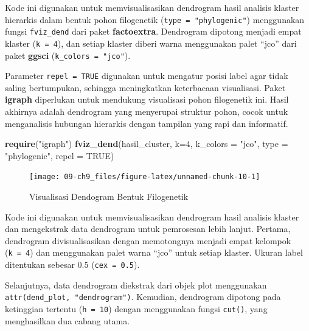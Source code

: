 \documentclass[
  oneside]{book}
\newenvironment{Shaded}{\begin{snugshade}}{\end{snugshade}}
\newcommand{\AttributeTok}[1]{\textcolor[rgb]{0.13,0.29,0.53}{#1}}
\newcommand{\ConstantTok}[1]{\textcolor[rgb]{0.56,0.35,0.01}{#1}}
\newcommand{\DecValTok}[1]{\textcolor[rgb]{0.00,0.00,0.81}{#1}}
\newcommand{\FunctionTok}[1]{\textcolor[rgb]{0.13,0.29,0.53}{\textbf{#1}}}
\newcommand{\NormalTok}[1]{#1}
\newcommand{\StringTok}[1]{\textcolor[rgb]{0.31,0.60,0.02}{#1}}
\begin{document}
Kode ini digunakan untuk memvisualisasikan dendrogram hasil analisis klaster hierarkis dalam bentuk pohon filogenetik (\texttt{type\ =\ "phylogenic"}) menggunakan fungsi \texttt{fviz\_dend} dari paket \textbf{factoextra}. Dendrogram dipotong menjadi empat klaster (\texttt{k\ =\ 4}), dan setiap klaster diberi warna menggunakan palet ``jco'' dari paket \textbf{ggsci} (\texttt{k\_colors\ =\ "jco"}).

Parameter \texttt{repel\ =\ TRUE} digunakan untuk mengatur posisi label agar tidak saling bertumpukan, sehingga meningkatkan keterbacaan visualisasi. Paket \textbf{igraph} diperlukan untuk mendukung visualisasi pohon filogenetik ini. Hasil akhirnya adalah dendrogram yang menyerupai struktur pohon, cocok untuk menganalisis hubungan hierarkis dengan tampilan yang rapi dan informatif.

\begin{Shaded}
\begin{Highlighting}[]
\FunctionTok{require}\NormalTok{(}\StringTok{"igraph"}\NormalTok{)}
\FunctionTok{fviz\_dend}\NormalTok{(hasil\_cluster, }\AttributeTok{k=}\DecValTok{4}\NormalTok{, }\AttributeTok{k\_colors =} \StringTok{"jco"}\NormalTok{,}
\AttributeTok{type =} \StringTok{"phylogenic"}\NormalTok{, }\AttributeTok{repel =} \ConstantTok{TRUE}\NormalTok{)}
\end{Highlighting}
\end{Shaded}

\begin{figure}[h]

{\centering \texttt{[image: 09-ch9\_files/figure-latex/unnamed-chunk-10-1]} 

}

\caption{Visualisasi Dendogram Bentuk Filogenetik}\label{fig:unnamed-chunk-10}
\end{figure}

Kode ini digunakan untuk memvisualisasikan dendrogram hasil analisis klaster dan mengekstrak data dendrogram untuk pemrosesan lebih lanjut. Pertama, dendrogram divisualisasikan dengan memotongnya menjadi empat kelompok (\texttt{k\ =\ 4}) dan menggunakan palet warna ``jco'' untuk setiap klaster. Ukuran label ditentukan sebesar 0.5 (\texttt{cex\ =\ 0.5}).

Selanjutnya, data dendrogram diekstrak dari objek plot menggunakan \texttt{attr(dend\_plot,\ "dendrogram")}. Kemudian, dendrogram dipotong pada ketinggian tertentu (\texttt{h\ =\ 10}) dengan menggunakan fungsi \texttt{cut()}, yang menghasilkan dua cabang utama.
\end{document}
